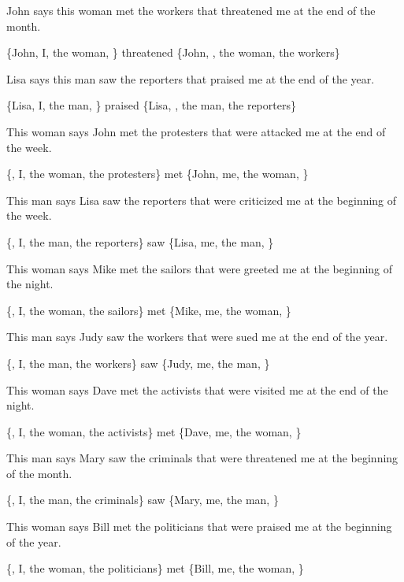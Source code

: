 \pex %
\a[label=S] John says this woman met the workers that threatened me at the end of the month.\par\nobreak
\a[label=Q] \{John, I, the woman, \} threatened \{John, , the woman, the workers\}
\xe

\pex %
\a[label=S] Lisa says this man saw the reporters that praised me at the end of the year.\par\nobreak
\a[label=Q] \{Lisa, I, the man, \} praised \{Lisa, , the man, the reporters\}
\xe

\pex %
\a[label=S] \ljudge{*}This woman says John met the protesters that were attacked me at the end of the week.\par\nobreak
\a[label=Q] \{, I, the woman, the protesters\} met \{John, me, the woman, \}
\xe

\pex %
\a[label=S] \ljudge{*}This man says Lisa saw the reporters that were criticized me at the beginning of the week.\par\nobreak
\a[label=Q] \{, I, the man, the reporters\} saw \{Lisa, me, the man, \}
\xe

\pex %
\a[label=S] \ljudge{*}This woman says Mike met the sailors that were greeted me at the beginning of the night.\par\nobreak
\a[label=Q] \{, I, the woman, the sailors\} met \{Mike, me, the woman, \}
\xe

\pex %
\a[label=S] \ljudge{*}This man says Judy saw the workers that were sued me at the end of the year.\par\nobreak
\a[label=Q] \{, I, the man, the workers\} saw \{Judy, me, the man, \}
\xe

\pex %
\a[label=S] \ljudge{*}This woman says Dave met the activists that were visited me at the end of the night.\par\nobreak
\a[label=Q] \{, I, the woman, the activists\} met \{Dave, me, the woman, \}
\xe

\pex %
\a[label=S] \ljudge{*}This man says Mary saw the criminals that were threatened me at the beginning of the month.\par\nobreak
\a[label=Q] \{, I, the man, the criminals\} saw \{Mary, me, the man, \}
\xe

\pex %
\a[label=S] \ljudge{*}This woman says Bill met the politicians that were praised me at the beginning of the year.\par\nobreak
\a[label=Q] \{, I, the woman, the politicians\} met \{Bill, me, the woman, \}
\xe

